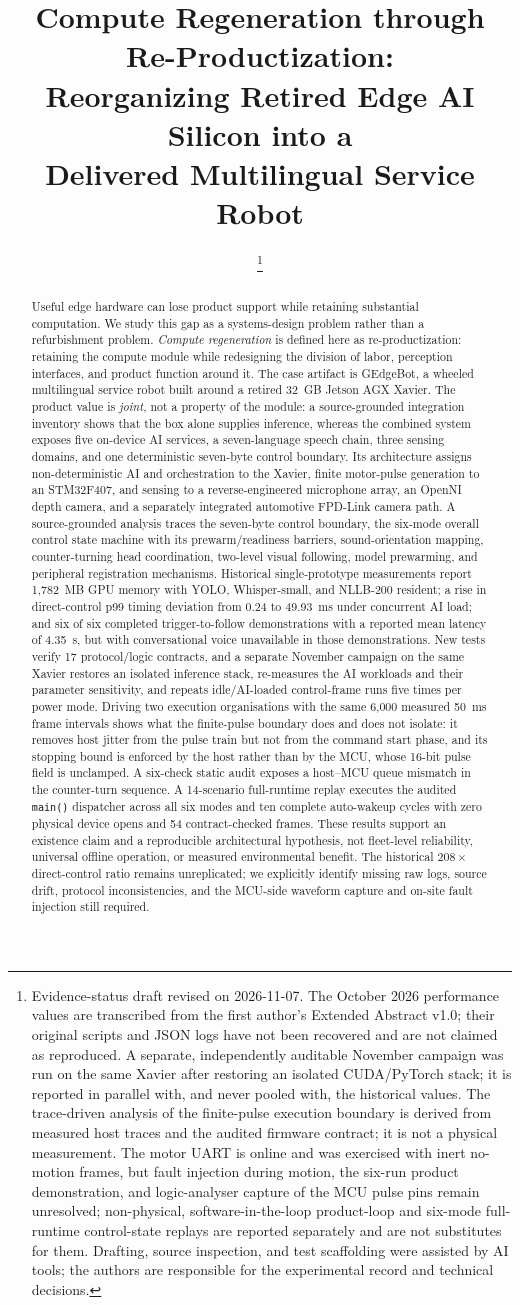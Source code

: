 \documentclass[conference]{IEEEtran}
\title{Compute Regeneration through Re-Productization:\\Reorganizing Retired Edge AI Silicon into a\\Delivered Multilingual Service Robot}
\author{\IEEEauthorblockN{Hongyu Luo}
\IEEEauthorblockA{Beijing Data Chain\\
Technology Co., Ltd.\\
Beijing, China\\
ORCID: 0009-0002-0152-2970\\
Email: luohongyu@gravity.link}
\and
\IEEEauthorblockN{Sun Tie}
\IEEEauthorblockA{University of Science\\
and Technology Beijing\\
Beijing, China\\
\mbox{}\\
Email: ggw@ustb.edu.cn}
\and
\IEEEauthorblockN{John Wang}
\IEEEauthorblockA{Beijing Data Chain\\
Technology Co., Ltd.\\
Beijing, China\\
\mbox{}\\
Email: john.wang@gravity.link}
\thanks{Evidence-status draft revised on 2026-11-07. The October 2026 performance values are transcribed from the first author's Extended Abstract v1.0; their original scripts and JSON logs have not been recovered and are not claimed as reproduced. A separate, independently auditable November campaign was run on the same Xavier after restoring an isolated CUDA/PyTorch stack; it is reported in parallel with, and never pooled with, the historical values. The trace-driven analysis of the finite-pulse execution boundary is derived from measured host traces and the audited firmware contract; it is not a physical measurement. The motor UART is online and was exercised with inert no-motion frames, but fault injection during motion, the six-run product demonstration, and logic-analyser capture of the MCU pulse pins remain unresolved; non-physical, software-in-the-loop product-loop and six-mode full-runtime control-state replays are reported separately and are not substitutes for them. Drafting, source inspection, and test scaffolding were assisted by AI tools; the authors are responsible for the experimental record and technical decisions.}}
\newcommand{\code}[1]{\texttt{#1}}
\begin{document}
\maketitle

\begin{abstract}
Useful edge hardware can lose product support while retaining substantial computation. We study this gap as a systems-design problem rather than a refurbishment problem. \emph{Compute regeneration} is defined here as re-productization: retaining the compute module while redesigning the division of labor, perception interfaces, and product function around it. The case artifact is GEdgeBot, a wheeled multilingual service robot built around a retired 32~GB Jetson AGX Xavier. The product value is \emph{joint}, not a property of the module: a source-grounded integration inventory shows that the box alone supplies inference, whereas the combined system exposes five on-device AI services, a seven-language speech chain, three sensing domains, and one deterministic seven-byte control boundary. Its architecture assigns non-deterministic AI and orchestration to the Xavier, finite motor-pulse generation to an STM32F407, and sensing to a reverse-engineered microphone array, an OpenNI depth camera, and a separately integrated automotive FPD-Link camera path. A source-grounded analysis traces the seven-byte control boundary, the six-mode overall control state machine with its prewarm/readiness barriers, sound-orientation mapping, counter-turning head coordination, two-level visual following, model prewarming, and peripheral registration mechanisms. Historical single-prototype measurements report 1,782~MB GPU memory with YOLO, Whisper-small, and NLLB-200 resident; a rise in direct-control p99 timing deviation from 0.24 to 49.93~ms under concurrent AI load; and six of six completed trigger-to-follow demonstrations with a reported mean latency of 4.35~s, but with conversational voice unavailable in those demonstrations. New tests verify 17 protocol/logic contracts, and a separate November campaign on the same Xavier restores an isolated inference stack, re-measures the AI workloads and their parameter sensitivity, and repeats idle/AI-loaded control-frame runs five times per power mode. Driving two execution organisations with the same 6,000 measured 50~ms frame intervals shows what the finite-pulse boundary does and does not isolate: it removes host jitter from the pulse train but not from the command start phase, and its stopping bound is enforced by the host rather than by the MCU, whose 16-bit pulse field is unclamped. A six-check static audit exposes a host--MCU queue mismatch in the counter-turn sequence. A 14-scenario full-runtime replay executes the audited \code{main()} dispatcher across all six modes and ten complete auto-wakeup cycles with zero physical device opens and 54 contract-checked frames. These results support an existence claim and a reproducible architectural hypothesis, not fleet-level reliability, universal offline operation, or measured environmental benefit. The historical $208\times$ direct-control ratio remains unreplicated; we explicitly identify missing raw logs, source drift, protocol inconsistencies, and the MCU-side waveform capture and on-site fault injection still required.

\end{abstract}
\end{document}
